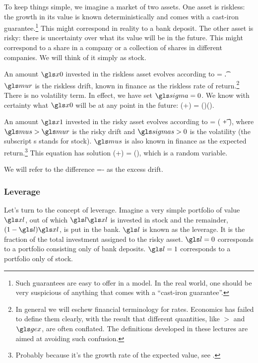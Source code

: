To keep things simple, we imagine a market of two assets. One asset is riskless: the growth in its value is known deterministically and comes with a cast-iron guarantee.\footnote{Such guarantees are easy to offer in a model. In the real world, one should be very suspicious of anything that comes with a ``cast-iron guarantee''.} This might correspond in reality to a bank deposit. The other asset is risky: there is uncertainty over what its value will be in the future. This might correspond to a share in a company or a collection of shares in different companies. We will think of it simply as stock.

An amount $\xzero$ invested in the riskless asset evolves according to
\be
\gd\xzero = \xzero \mur \gd\t.
\ee
$\mur$ is the riskless drift, known in finance as the riskless rate of return.\footnote{In general we will eschew financial terminology for rates. Economics has failed to define them clearly, with the result that different quantities, like $\gt$ and $\gex$, are often conflated. The definitions developed in these lectures are aimed at avoiding such confusion.} There is no volatility term. In effect, we have set $\gsigma=0$. We know with certainty what $\xzero$ will be at any point in the future: 
\be
\xzero(\tn+\Dt) = \xzero(\tn)\exp(\mur\Dt).
\ee

An amount $\xone$ invested in the risky asset evolves according to
\be
\gd\xone = \xone ( \mus \gd\t + \sigmas \gd\gW ),
\ee
where $\mus>\mur$ is the risky drift and $\sigmas>0$ is the volatility (the subscript s stands for stock). $\mus$ is also known in finance as the expected return.\footnote{Probably because it's the growth rate of the expected value, see .} This equation has solution
\be
\xone(\tn+\Dt) = \xone(\tn)\exp{},
\ee
which is a random variable.

We will refer to the difference
\be
\mue=\mus-\mur
{}
\ee
as the excess drift. 

\subsubsection{Leverage}
Let's turn to the concept of leverage. Imagine a very simple portfolio of value $\xl$, out of which $\l \xl$ is invested in stock and the remainder, $(1-\l)\xl$, is put in the bank. $\l$ is known as the leverage. It is the fraction of the total investment assigned to the risky asset. $\l=0$ corresponds to a portfolio consisting only of bank deposits. $\l=1$ corresponds to a portfolio only of stock.

